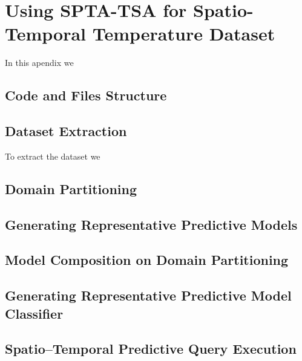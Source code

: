 \chapter{Using SPTA-TSA for Spatio-Temporal Temperature Dataset}
\label{apendiceA}

In this apendix we 

\section{Code and Files Structure}


\section{Dataset Extraction}

To extract the dataset we 



\section{Domain Partitioning}



\section{Generating Representative Predictive Models}


\section{Model Composition on Domain Partitioning}


\section{Generating Representative Predictive Model Classifier}


\section{Spatio--Temporal Predictive Query Execution}

